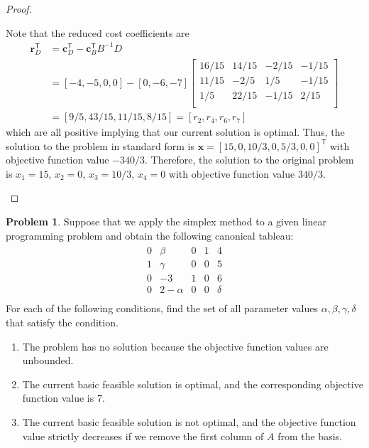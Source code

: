 \documentclass[12pt]{article}
\theoremstyle{definition}
\newtheorem{problem}{Problem}
\newcommand{\vect}[1]{\boldsymbol{#1}}
\newcommand{\tran}{\mathsf{T}}
\begin{document}
\begin{proof}
\begin{enumerate}
      Note that the reduced cost coefficients are
      \begin{align*}
        \vect{r}_D^\tran &= \vect{c}_D^\tran - \vect{c}_B^\tran B^{-1} D \\
        &= [-4, -5, 0, 0] - [0, -6, -7]
        \begin{bmatrix}
          16/15 & 14/15 & -2/15 & -1/15 \\
          11/15 & -2/5 & 1/5 & -1/15 \\
          1/5 & 22/15 & -1/15 & 2/15 \\
        \end{bmatrix} \\
        &= [9/5, 43/15, 11/15, 8/15] = [r_2, r_4, r_6, r_7]
      \end{align*}
      which are all positive implying that our current solution is optimal.
      Thus, the solution to the problem in standard form is $\vect{x} = [15,0,10/3,0,5/3,0,0]^\tran$
      with objective function value $-340/3$. Therefore, the solution to the original problem
      is $x_1 = 15$, $x_2 = 0$, $x_3=10/3$, $x_4=0$ with objective function value $340/3$.
  \end{enumerate}
\end{proof}
\newpage


\begin{problem}
  Suppose that we apply the simplex method to a given linear programming
  problem and obtain the following canonical tableau:
  \begin{align*}
    \begin{matrix}
      0 & \beta & 0 & 1 & 4 \\
      1 & \gamma & 0 & 0 & 5 \\
      0 & -3 & 1 & 0 & 6 \\
      0 & 2 - \alpha & 0 & 0 & \delta \\
    \end{matrix}
  \end{align*}
  For each of the following conditions, find the set of all parameter values
  $\alpha, \beta, \gamma, \delta$ that satisfy the condition.
  \begin{enumerate}
    \item The problem has no solution because the objective function values are
      unbounded.
    \item The current basic feasible solution is optimal, and the corresponding
      objective function value is 7.
    \item The current basic feasible solution is not optimal, and the objective
      function value strictly decreases if we remove the first column of $A$ from
      the basis.
  \end{enumerate}
\end{problem}
\end{document}
